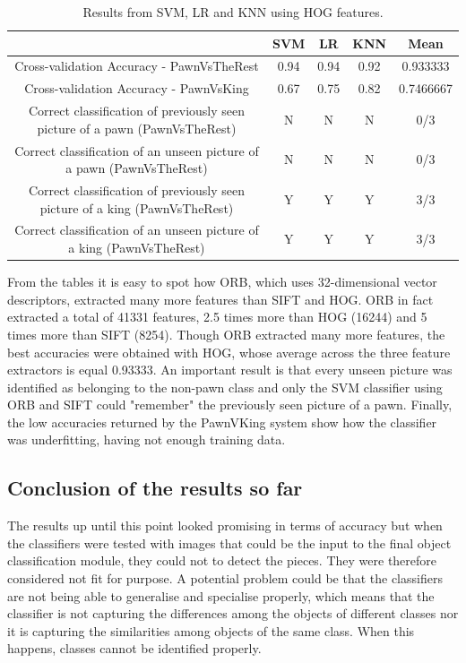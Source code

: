 \documentclass{l4proj}
\begin{document}
\begin{table}[h!] \label{HOGTable2}
	\centering
	\begin{tabular}{|c|c|c|c|c|} 
	\hline
	 & SVM & LR & KNN & Mean  \\
	\hline
	\rowcolor{brown!45} Cross-validation Accuracy - PawnVsTheRest & 0.94 & 0.94 & 0.92 & 0.933333 \\
	Cross-validation Accuracy - PawnVsKing & 0.67 & 0.75 & 0.82 & 0.7466667\\
	\rowcolor{brown!45} Correct classification of previously seen picture of a pawn (PawnVsTheRest) & N & N & N & 0/3 \\
	Correct classification of an unseen picture of a pawn (PawnVsTheRest) & N & N & N & 0/3 \\
	\rowcolor{brown!45} Correct classification of previously seen picture of a king (PawnVsTheRest) & Y & Y & Y & 3/3 \\
	Correct classification of an unseen picture of a king (PawnVsTheRest) & Y & Y & Y & 3/3 \\
	\hline
	\end{tabular}
	\caption{Results from SVM, LR and KNN using HOG features.}
\end{table}




\pagebreak
From the tables it is easy to spot how ORB, which uses 32-dimensional vector descriptors, extracted many more features than SIFT and HOG. ORB in fact extracted a total of 41331 features, 2.5 times more than HOG (16244) and 5 times more than SIFT (8254). Though ORB extracted many more features, the best accuracies were obtained with HOG, whose average across the three feature extractors is equal 0.93333.
An important result is that every unseen picture was identified as belonging to the non-pawn class and only the SVM classifier using ORB and SIFT could "remember" the previously seen picture of a pawn.
Finally, the low accuracies returned by the PawnVKing system show how the classifier was underfitting, having not enough training data.

\subsection{Conclusion of the results so far}

The results up until this point looked promising in terms of accuracy but when the classifiers were tested with images that could be the input to the final object classification module, they could not to detect the pieces. They were therefore considered not fit for purpose. A potential problem could be that the classifiers are not being able to generalise and specialise properly, which means that the classifier is not capturing the differences among the objects of different classes nor it is capturing the similarities among objects of the same class. When this happens, classes cannot be identified properly.
\end{document}

